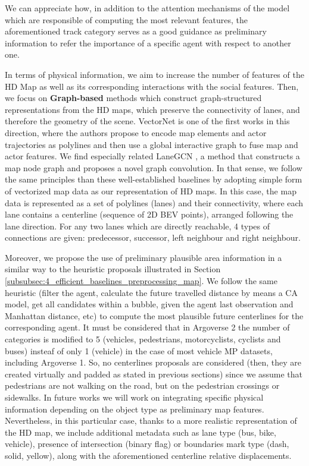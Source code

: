 We can appreciate how, in addition to the attention mechanisms of the model which are responsible of computing the most relevant features, the aforementioned track category serves as a good guidance as preliminary information to refer the importance of a specific agent with respect to another one.

In terms of physical information, we aim to increase the number of features of the HD Map as well as its corresponding interactions with the social features. Then, we focus on \textbf{Graph-based} methods \cite{zeng2021lanercnn} which construct graph-structured representations from the HD maps, which preserve the connectivity of lanes, and therefore the geometry of the scene. VectorNet \cite{gao2020vectornet} is one of the first works in this direction, where the authors propose to encode map elements and actor trajectories as polylines and then use a global interactive graph to fuse map and actor features. We find especially related LaneGCN \cite{liang2020learninggraph}, a method that constructs a map node graph and proposes a novel graph convolution. In that sense, we follow the same principles than these well-established baselines by adopting simple form of vectorized map data as our representation of HD maps. In this case, the map data is represented as a set of polylines (lanes) and
their connectivity, where each lane contains a centerline (sequence of 2D \ac{BEV} points), arranged following the lane direction. For any two lanes which are directly reachable, 4 types of connections are given: predecessor, successor, left neighbour and right neighbour.

Moreover, we propose the use of preliminary plausible area information in a similar way to the heuristic proposals illustrated in Section \ref{subsubsec:4_efficient_baselines_preprocessing_map}. We follow the same heuristic (filter the agent, calculate the future travelled distance by means a CA model, get all candidates within a bubble, given the agent last observation and Manhattan distance, etc) to compute the most plausible future centerlines for the corresponding agent. It must be considered that in Argoverse 2 the number of categories is modified to 5 (vehicles, pedestrians, motorcyclists, cyclists and buses) insteaf of only 1 (vehicle) in the case of most vehicle \ac{MP} datasets, including Argoverse 1. So, no centerlines proposals are considered (then, they are created virtually and padded as stated in previous sections) since we assume that pedestrians are not walking on the road, but on the pedestrian crossings or sidewalks. In future works we will work on integrating specific physical information depending on the object type as preliminary map features. Nevertheless, in this particular case, thanks to a more realistic representation of the HD map, we include additional metadata such as lane type (bus, bike, vehicle), presence of intersection (binary flag) or boundaries mark type (dash, solid, yellow), along with the aforementioned centerline relative displacements. 


